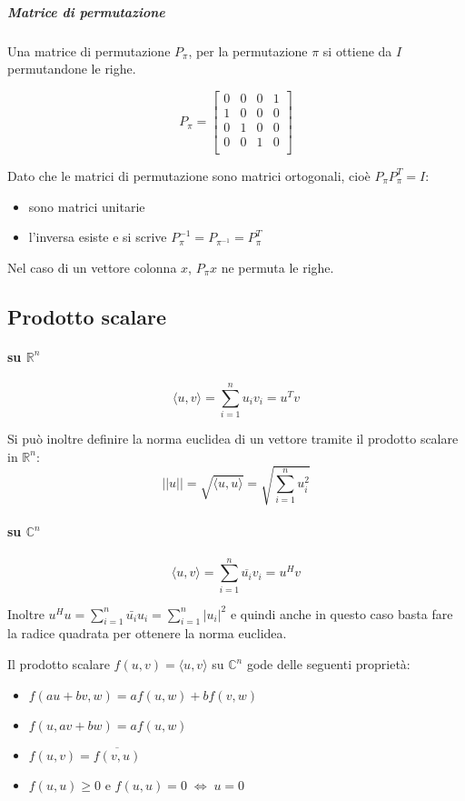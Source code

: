 \subparagraph{Matrice di permutazione}
Una matrice di permutazione $P_{\pi}$, per la permutazione $\pi$ 
si ottiene da $I$ permutandone le righe.
\begin{example}
  $$P_{\pi} =
  \begin{bmatrix}
    0 & 0 & 0 & 1  \\
    1 & 0 & 0 & 0  \\
    0 & 1 & 0 & 0  \\
    0 & 0 & 1 & 0  \\
  \end{bmatrix}
  $$
\end{example}

Dato che le matrici di permutazione sono matrici ortogonali, cio\`e
$P_{\pi}P_{\pi}^{T} = I$:

\begin{itemize}
\item sono matrici unitarie
\item l'inversa esiste e si scrive $P_{\pi}^{-1} = P_{\pi^{-1}} = P_{\pi}^{T}$
\end{itemize}

Nel caso di un vettore colonna $x$, $P_{\pi} x$ ne permuta le righe.

\subsection{Prodotto scalare}
\paragraph{su $\mathbb{R}^{n}$}
$$\langle u, v \rangle = \sum_{i=1}^{n} u_{i} v_{i} = u^{T}v$$

Si può inoltre definire la norma euclidea di un vettore tramite il
prodotto scalare in $\mathbb{R}^n$:
$$ || u || = \sqrt{\langle u,u \rangle} = \sqrt{\sum_{i=1}^{n} u_{i}^2} $$

\paragraph{su $\mathbb{C}^{n}$}
$$\langle u, v \rangle = \sum_{i=1}^{n} \overline{u_{i}} v_{i} = u^{H}v$$

Inoltre $u^{H} u = \sum_{i=1}^{n} \bar{u_i}u_i = \sum_{i=1}^{n} |
u_i|^{2}$ e quindi anche in questo caso basta fare la radice quadrata
per ottenere la norma euclidea.
\begin{property}\label{eigenvalues:ei001}
Il prodotto scalare $f(u,v)=\langle u,v \rangle$ su $\mathbb{C}^{n}$ gode
 delle seguenti proprietà:
\begin{itemize}
\item $f(au + bv, w) = af(u,w) + bf(v,w)$
\item $f(u,av + bw) = af(u,w)$
\item $f(u,v) = \overline{f(v,u)}$
\item $f(u,u) \geq 0$ \quad e 
       \quad  $f(u,u) = 0 \; \Longleftrightarrow \; u = 0$
\end{itemize}
\end{property}

